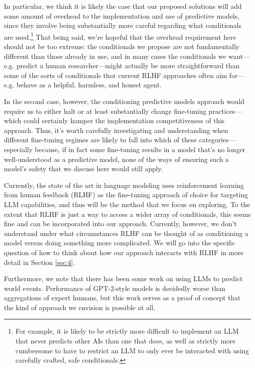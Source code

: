 \documentclass[
  onecolumn,
  nonatbib,
]{miri-tech-article}
\begin{document}
In particular, we think it is likely the case that our proposed solutions will add some amount of overhead to the implementation and use of predictive models, since they involve being substantially more careful regarding what conditionals are used.\footnote{For example, it is likely to be strictly more difficult to implement an LLM that never predicts other AIs than one that does, as well as strictly more cumbersome to have to restrict an LLM to only ever be interacted with using carefully crafted, safe conditionals.} That being said, we're hopeful that the overhead requirement here should not be too extreme: the conditionals we propose are not fundamentally different than those already in use, and in many cases the conditionals we want---e.g. predict a human researcher---might actually be more straightforward than some of the sorts of conditionals that current RLHF approaches often aim for---e.g. behave as a helpful, harmless, and honest agent\cite{bai_training_2022}.

In the second case, however, the conditioning predictive models approach would require us to either halt or at least substantially change fine-tuning practices---which could certainly hamper the implementation competitiveness of this approach. Thus, it's worth carefully investigating and understanding when different fine-tuning regimes are likely to fall into which of these categories---especially because, if in fact some fine-tuning results in a model that's no longer well-understood as a predictive model, none of the ways of ensuring such a model's safety that we discuss here would still apply.

Currently, the state of the art in language modeling uses reinforcement learning from human feedback (RLHF) as the fine-tuning approach of choice for targeting LLM capabilities, and thus will be the method that we focus on exploring. To the extent that RLHF is just a way to access a wider array of conditionals\cite{conditioning_prompts_fine_tuning}, this seems fine and can be incorporated into our approach. Currently, however, we don't understand under what circumstances RLHF can be thought of as conditioning a model versus doing something more complicated. We will go into the specific question of how to think about how our approach interacts with RLHF in more detail in Section \ref{sec:4}.

Furthermore, we note that there has been some work\cite{zou_forecasting_2022} on using LLMs to predict world events. Performance of GPT-2-style models is decidedly worse than aggregations of expert humans, but this work serves as a proof of concept that the kind of approach we envision is possible at all.
\end{document}
